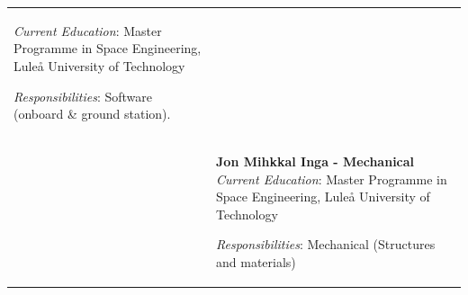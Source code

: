 \begin{longtable}[]{m{} m{}}
\smallskip
\textit{Current Education}: Master Programme in Space Engineering, Luleå University of Technology

\smallskip
\textit{Responsibilities}: Software (onboard \& ground station).
\bigskip
\\

 & \textbf{Jon Mihkkal Inga - Mechanical}
\smallskip
\textit{Current Education}: Master Programme in Space Engineering, Luleå University of Technology

\smallskip
\textit{Responsibilities}: Mechanical (Structures and materials)

\label{tab:people}
\end{longtable}
\raggedbottom

